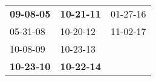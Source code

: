 \begin{supertabular}{p{0.33\columnwidth}p{0.33\columnwidth}p{0.33\columnwidth}}
 \textbf{09-08-05\textsuperscript{}} &  \textbf{10-21-11\textsuperscript{}} &  01-27-16\textsuperscript{} \\
          05-31-08\textsuperscript{} &           10-20-12\textsuperscript{} &  11-02-17\textsuperscript{} \\
          10-08-09\textsuperscript{} &           10-23-13\textsuperscript{} &                             \\
 \textbf{10-23-10\textsuperscript{}} &  \textbf{10-22-14\textsuperscript{}} &                             \\
\end{supertabular}
